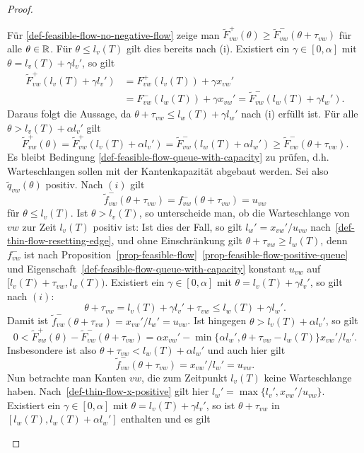 \begin{proof}
\begin{description}[leftmargin=0cm, topsep=0cm, itemindent=0.5cm]
		Für \ref{def-feasible-flow-no-negative-flow} zeige man $\tilde{F}^+_{vw}(\theta)\geq \tilde{F}_{vw}^-(\theta+\tau_{vw})$ für alle $\theta\in\mathbb{R}$.
		Für $\theta\leq l_v(T)$ gilt dies bereits nach (i).
		Existiert ein $\gamma\in[0, \alpha]$ mit $\theta=l_v(T) + \gamma l_v'$, so gilt
		\begin{align*}
		\tilde{F}_{vw}^+(l_v(T) + \gamma l_v')&=F_{vw}^+(l_v(T))+\gamma x_{vw}'\\
		&= F_{vw}^-(l_w(T))+ \gamma x_{vw}'= \tilde{F}_{vw}^-(l_w(T)+\gamma l_w').
		\end{align*}
		Daraus folgt die Aussage, da $\theta + \tau_{vw}\leq l_w(T) + \gamma l_w'$ nach (i) erfüllt ist.
		Für alle $\theta > l_v(T)+\alpha l_v'$ gilt 
		\[\tilde{F}_{vw}^+(\theta) = \tilde{F}_{vw}^+(l_v(T) + \alpha l_v') = \tilde{F}_{vw}^-(l_w(T) + \alpha l_w') \geq \tilde{F}_{vw}^-(\theta + \tau_{vw}).\]
		Es bleibt Bedingung \ref{def-feasible-flow-queue-with-capacity} zu prüfen, d.h. Warteschlangen sollen mit der Kantenkapazität abgebaut werden.
		Sei also $\tilde{q}_{vw}(\theta)$ positiv.
		Nach $(i)$ gilt
		\[
		\tilde{f}_{vw}^-(\theta + \tau_{vw}) = f_{vw}^-(\theta + \tau_{vw}) = u_{vw}
		\]
		für $\theta\leq l_v(T)$.
		Ist $\theta > l_v(T)$, so unterscheide man, ob die Warteschlange von $vw$ zur Zeit $l_v(T)$ positiv ist:
		Ist dies der Fall, so gilt $l_w' = x_{vw}' / u_{vw}$ nach~\ref{def-thin-flow-resetting-edge}, und ohne Einschränkung gilt $\theta + \tau_{vw} \geq l_w(T)$, denn $f_{vw}^-$ ist nach Proposition~\ref{prop-feasible-flow}~\ref{prop-feasible-flow-positive-queue} und Eigenschaft~\ref{def-feasible-flow-queue-with-capacity} konstant $u_{vw}$ auf $[l_v(T)+\tau_{vw},l_w(T))$.
		Existiert ein $\gamma\in [0, \alpha]$ mit $\theta = l_v(T) + \gamma l_v'$, so gilt nach $(i)$:
		\[
		\theta + \tau_{vw} = l_v(T) + \gamma l_v' + \tau_{vw} \leq l_w(T) + \gamma l_w'.
		\]
		Damit ist $\tilde{f}^-_{vw}(\theta + \tau_{vw}) = x_{vw}'/l_w' = u_{vw}$.
		Ist  hingegen $\theta > l_v(T) + \alpha l_v'$, so gilt
		\[
		0<\tilde{F}^+_{vw}(\theta) - \tilde{F}_{vw}^-(\theta +\tau_{vw}) = \alpha x_{vw}' - \min \{ \alpha l_w', \theta + \tau_{vw} - l_w(T) \} x_{vw}' / l_w'.
		\]
		Insbesondere ist also $\theta + \tau_{vw} < l_w(T) + \alpha l_w'$ und auch hier gilt \[
		\tilde{f}^-_{vw}(\theta + \tau_{vw}) = x_{vw}'/l_w' = u_{vw}.
		\]
		Nun betrachte man Kanten $vw$, die zum Zeitpunkt $l_v(T)$ keine Warteschlange haben.
		Nach~\ref{def-thin-flow-x-positive} gilt hier $l_w' = \max \{ l_v', x_{vw}' / u_{vw}  \}$.
		Existiert ein $\gamma\in [0, \alpha]$ mit $\theta = l_v(T) + \gamma l_v'$, so ist $\theta+\tau_{vw}$ in $[l_w(T), l_w(T) + \alpha l_w']$ enthalten und es gilt

\end{description}
\end{proof}
